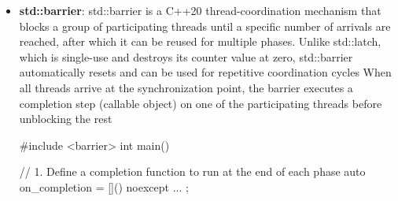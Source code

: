 \documentclass{report}
\begin{document}
\begin{itemize}
\begin{cppcode}
                std::latch completed(4);

                void worker() {
                    perform_work();
                    completed.count_down();
                }

                // Start four workers...
                completed.wait();
            \end{cppcode}
            \bigbreak \noindent 
            std::latch is a C++20 thread synchronization primitive that pauses one or more threads until a downward counter reaches zero
            \begin{itemize}
                \item \textbf{Single-Use:} Once the internal counter hits zero, the latch is done and cannot be reset or reused.
                \item \textbf{No Increment:} You cannot increase the counter after creation; you only count it down.
            \end{itemize}
            std::latch::wait blocks the calling thread until the internal counter of the std::latch reaches zero.
            \bigbreak \noindent 
            \begin{cppcode}
                #include <latches>
                #include <thread>
                #include <vector>

                // Initialize latch with count for 3 workers
                std::latch work_latch(3);

                for (int i = 0; i < 3; ++i) {
                    std::thread([&work_latch]() {
                        // Do work...
                        work_latch.count_down(); // Signal completion
                    }).detach();
                }

                work_latch.wait(); // Main thread blocks here until all 3 workers finish
            \end{cppcode}
        \item \textbf{std::barrier}: std::barrier is a C++20 thread-coordination mechanism that blocks a group of participating threads until a specific number of arrivals are reached, after which it can be reused for multiple phases. 
            \bigbreak \noindent 
             Unlike std::latch, which is single-use and destroys its counter value at zero, std::barrier automatically resets and can be used for repetitive coordination cycles
             \bigbreak \noindent 
             When all threads arrive at the synchronization point, the barrier executes a completion step (callable object) on one of the participating threads before unblocking the rest
             \bigbreak \noindent 
             \begin{cppcode}
                 #include <barrier>
                 int main() {
                     // 1. Define a completion function to run at the end of each phase
                     auto on_completion = []() noexcept {
                          ...
                     };

}
\end{cppcode}
\end{itemize}
\end{document}
